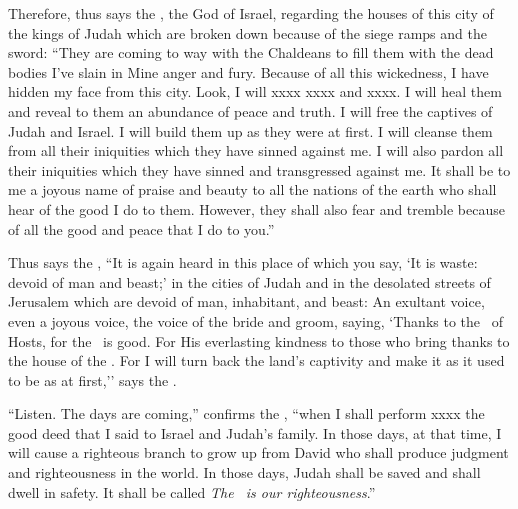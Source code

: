 
\begin{inparaenum}
  
   Therefore, thus says the \lord, the God of Israel, regarding the houses of this city of the kings of Judah which are broken down because of the siege ramps and the sword:%
   ``They are coming to way with the Chaldeans to fill them with the dead bodies I've slain in Mine anger and fury. Because of all this wickedness, I have hidden my face from this city.%
   Look, I will xxxx xxxx and xxxx. I will heal them and reveal to them an abundance of peace and truth.%
   I will free the captives of Judah and Israel. I will build them up as they were at first.%
   I will cleanse them from all their iniquities which they have sinned against me. I will also pardon all their iniquities which they have sinned and transgressed against me.%
   It shall be to me a joyous name of praise and beauty to all the nations of the earth who shall hear of the good I do to them. However, they shall also fear and tremble because of all the good and peace that I do to you.''%
  
   Thus says the \lord, ``It is again heard in this place of which you say, `It is waste: devoid of man and beast;' in the cities of Judah and in the desolated streets of Jerusalem which are devoid of man, inhabitant, and beast:%
   An exultant voice, even a joyous voice, the voice of the bride and groom, saying, `Thanks to the \lord\ of Hosts, for the \lord\ is good. For His everlasting kindness to those who bring thanks to the house of the \lord. For I will turn back the land's captivity and make it as it used to be as at first,'' says the \lord.%
  
  
   ``Listen. The days are coming,'' confirms the \lord, ``when I shall perform xxxx the good deed that I said to Israel and Judah's family.%
   In those days, at that time, I will cause a righteous branch to grow up from David who shall produce judgment and righteousness in the world.%
   In those days, Judah shall be saved and shall dwell in safety. It shall be called \textit{The \lord\ is our righteousness}.''%
  

\end{inparaenum}
